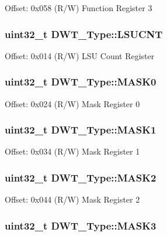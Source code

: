 Offset\-: 0x058 (R/\-W) Function Register 3 \hypertarget{structDWT__Type_aeba92e6c7fd3de4ba06bfd94f47f5b35}{
\subsubsection[{L\-S\-U\-C\-N\-T}]{ uint32\-\_\-t D\-W\-T\-\_\-\-Type\-::\-L\-S\-U\-C\-N\-T}}\label{structDWT__Type_aeba92e6c7fd3de4ba06bfd94f47f5b35}
Offset\-: 0x014 (R/\-W) L\-S\-U Count Register \hypertarget{structDWT__Type_a5bb1c17fc754180cc197b874d3d8673f}{
\subsubsection[{M\-A\-S\-K0}]{ uint32\-\_\-t D\-W\-T\-\_\-\-Type\-::\-M\-A\-S\-K0}}\label{structDWT__Type_a5bb1c17fc754180cc197b874d3d8673f}
Offset\-: 0x024 (R/\-W) Mask Register 0 \hypertarget{structDWT__Type_a0c684438a24f8c927e6e01c0e0a605ef}{
\subsubsection[{M\-A\-S\-K1}]{ uint32\-\_\-t D\-W\-T\-\_\-\-Type\-::\-M\-A\-S\-K1}}\label{structDWT__Type_a0c684438a24f8c927e6e01c0e0a605ef}
Offset\-: 0x034 (R/\-W) Mask Register 1 \hypertarget{structDWT__Type_a8ecdc8f0d917dac86b0373532a1c0e2e}{
\subsubsection[{M\-A\-S\-K2}]{ uint32\-\_\-t D\-W\-T\-\_\-\-Type\-::\-M\-A\-S\-K2}}\label{structDWT__Type_a8ecdc8f0d917dac86b0373532a1c0e2e}
Offset\-: 0x044 (R/\-W) Mask Register 2 \hypertarget{structDWT__Type_ae3f01137a8d28c905ddefe7333547fba}{
\subsubsection[{M\-A\-S\-K3}]{ uint32\-\_\-t D\-W\-T\-\_\-\-Type\-::\-M\-A\-S\-K3}}\label{structDWT__Type_ae3f01137a8d28c905ddefe7333547fba}
